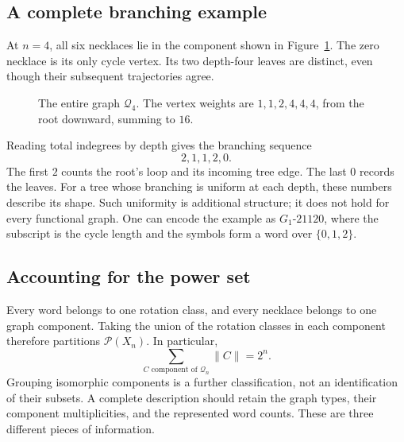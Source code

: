 \documentclass[11pt]{article}
\theoremstyle{definition}
\newcommand{\neck}[1]{[\mathtt{#1}]}
\numberwithin{equation}{section}
\begin{document}
\subsection{A complete branching example}

At $n=4$, all six necklaces lie in the component shown in
Figure~\ref{fig:four}. The zero necklace is its only cycle vertex.
Its two depth-four leaves are distinct, even though their subsequent
trajectories agree.

\begin{figure}[htbp]
\centering
{}
\caption{The entire graph $\mathcal Q_4$. The vertex weights are
$1,1,2,4,4,4$, from the root downward, summing to $16$.}
\label{fig:four}
\end{figure}

Reading total indegrees by depth gives the branching sequence
\[
 2,1,1,2,0.
\]
The first $2$ counts the root's loop and its incoming tree edge.
The last $0$ records the leaves. For a tree whose branching is uniform
at each depth, these numbers describe its shape. Such uniformity is
additional structure; it does not hold for every functional graph.
One can encode the example as $G_1\text{-}21120$, where the subscript
is the cycle length and the symbols form a word over $\{0,1,2\}$.

\subsection{Accounting for the power set}

Every word belongs to one rotation class, and every necklace belongs
to one graph component. Taking the union of the rotation classes in
each component therefore partitions $\mathcal P(X_n)$. In particular,
\begin{equation}\label{eq:accounting}
 \sum_{C\text{ component of }\mathcal Q_n}\lVert C\rVert=2^n.
\end{equation}
Grouping isomorphic components is a further classification, not an
identification of their subsets. A complete description should retain
the graph types, their component multiplicities, and the represented
word counts. These are three different pieces of information.
\end{document}
